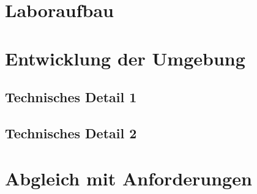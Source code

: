 	\section{Laboraufbau}
	\section{Entwicklung der Umgebung}
		\subsection{Technisches Detail 1}
		\subsection{Technisches Detail 2}
	\section{Abgleich mit Anforderungen}